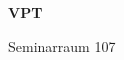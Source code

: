 \documentclass[a4paper]{article}
\begin{document}
\printGenericVSLHeader
\begin{center}
\begin{vsltext}{3cm}{4cm}

   \vspace{0.5cm} 

    \textbf{VPT} 

    \vspace{1.5cm}

    Seminarraum 107

\end{vsltext}

\end{center}
\end{document}
